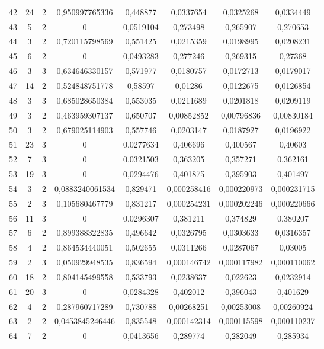 \begin{longtable}{|c|c|c|c|c|c|c|c|}
42 & 24 & 2 & 0,950997765336 & 0,448877 & 0,0337654 & 0,0325268 & 0,0334449  \\
43 & 5 & 2 & 0 & 0,0519104 & 0,273498 & 0,265907 & 0,270653  \\
44 & 3 & 2 & 0,720115798569 & 0,551425 & 0,0215359 & 0,0198995 & 0,0208231  \\
45 & 6 & 2 & 0 & 0,0493283 & 0,277246 & 0,269315 & 0,27368  \\
46 & 3 & 3 & 0,634646330157 & 0,571977 & 0,0180757 & 0,0172713 & 0,0179017  \\
47 & 14 & 2 & 0,524848751778 & 0,58597 & 0,01286 & 0,0122675 & 0,0126854  \\
48 & 3 & 3 & 0,685028650384 & 0,553035 & 0,0211689 & 0,0201818 & 0,0209119  \\
49 & 3 & 2 & 0,463959307137 & 0,650707 & 0,00852852 & 0,00796836 & 0,00830184  \\
50 & 3 & 2 & 0,679025114903 & 0,557746 & 0,0203147 & 0,0187927 & 0,0196922  \\
51 & 23 & 3 & 0 & 0,0277634 & 0,406696 & 0,400567 & 0,40603  \\
52 & 7 & 3 & 0 & 0,0321503 & 0,363205 & 0,357271 & 0,362161  \\
53 & 19 & 3 & 0 & 0,0294476 & 0,401875 & 0,395903 & 0,401497  \\
54 & 3 & 2 & 0,0883240061534 & 0,829471 & 0,000258416 & 0,000220973 & 0,000231715  \\
55 & 2 & 3 & 0,105680467779 & 0,831217 & 0,000254231 & 0,000202246 & 0,000220666  \\
56 & 11 & 3 & 0 & 0,0296307 & 0,381211 & 0,374829 & 0,380207  \\
57 & 6 & 2 & 0,899388322835 & 0,496642 & 0,0326795 & 0,0303633 & 0,0316357  \\
58 & 4 & 2 & 0,864534440051 & 0,502655 & 0,0311266 & 0,0287067 & 0,03005  \\
59 & 2 & 3 & 0,050929948535 & 0,836594 & 0,000146742 & 0,000117982 & 0,000110062  \\
60 & 18 & 2 & 0,804145499558 & 0,533793 & 0,0238637 & 0,022623 & 0,0232914  \\
61 & 20 & 3 & 0 & 0,0284328 & 0,402012 & 0,396043 & 0,401629  \\
62 & 4 & 2 & 0,287960717289 & 0,730788 & 0,00268251 & 0,00253008 & 0,00260924  \\
63 & 2 & 2 & 0,0453845246446 & 0,835548 & 0,000142314 & 0,000115598 & 0,000110237  \\
64 & 7 & 2 & 0 & 0,0413656 & 0,289774 & 0,282049 & 0,285934  \\

\end{longtable}
